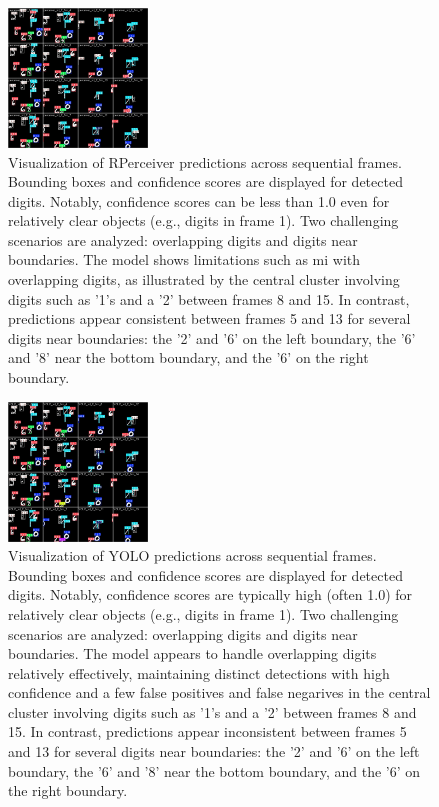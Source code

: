 \begin{figure}
    \centering
    \includegraphics[width=0.33\textwidth]{figures/figure_methods_val_batch2_pred_recurrent_perceiver.jpg}
    \caption{Visualization of RPerceiver predictions across sequential frames. Bounding boxes and confidence scores are displayed for detected digits. Notably, confidence scores can be less than 1.0 even for relatively clear objects (e.g., digits in frame 1). Two challenging scenarios are analyzed: overlapping digits and digits near boundaries. The model shows limitations such as mi with overlapping digits, as illustrated by the central cluster involving digits such as '1's and a '2' between frames 8 and 15. In contrast, predictions appear consistent between frames 5 and 13 for several digits near boundaries: the '2' and '6' on the left boundary, the '6' and '8' near the bottom boundary, and the '6' on the right boundary.}
    \label{fig:figure_methods_val_batch2_pred_recurrent_perceiver}
\end{figure}

\begin{figure}
    \centering
    \includegraphics[width=0.33\textwidth]{figures/figure_methods_val_batch2_pred_YOLO.jpg}
    \caption{Visualization of YOLO predictions across sequential frames. Bounding boxes and confidence scores are displayed for detected digits. Notably, confidence scores are typically high (often 1.0) for relatively clear objects (e.g., digits in frame 1). Two challenging scenarios are analyzed: overlapping digits and digits near boundaries. The model appears to handle overlapping digits relatively effectively, maintaining distinct detections with high confidence and a few false positives and false negarives in the central cluster involving digits such as '1's and a '2' between frames 8 and 15. In contrast, predictions appear inconsistent between frames 5 and 13 for several digits near boundaries: the '2' and '6' on the left boundary, the '6' and '8' near the bottom boundary, and the '6' on the right boundary.}
    \label{fig:figure_methods_val_batch2_pred_YOLO}
\end{figure}

